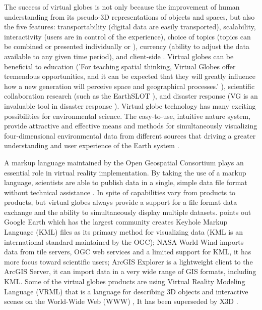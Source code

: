 The success of virtual globes \parencite{tuttle.virtual-globes.2008} is not only because the improvement of human understanding from its pseudo-3D representations of objects and spaces, but also the five features: transportability (digital data are easily transported), scalability, interactivity (users are in control of the experience), choice of topics (topics can be combined or presented individually or ), currency (ability to adjust the data available to any given time period), and client-side \parencite{tuttle.virtual-globes.2008}. Virtual globes can be beneficial to education ('For teaching spatial thinking, Virtual Globes offer tremendous opportunities, and it can be expected that they will greatly influence how a new generation will perceive space and geographical processes.' \parencite{nuernberger.vr-classroom.2006}), scientific collaboration research (such as the EarthSLOT \parencite{earthslot.2016}), and disaster response (VG is an invaluable tool in disaster response \parencite{butler.vg.2006, nourbakhsh.mapping-disaster-zones.2006}). Virtual globe technology has many exciting possibilities for environmental science. The easy-to-use, intuitive nature system, provide attractive and effective means and methods for simultaneously visualizing four-dimensional environmental data from different sources that driving a greater understanding and user experience of the Earth system \parencite{blower.sharing-visualizing.2007}. 

A markup language maintained by the Open Geospatial Consortium \parencite{ogc.2016} plays an essential role in virtual reality implementation. By taking the use of a markup language, scientists are able to publish data in a single, simple data file format without technical assistance \parencite{blower.sharing-visualizing.2007}. In spite of capabilities vary from products to products, but virtual globes always provide a support for a file format data exchange and the ability to simultaneously display multiple datasets. \parencite{blower.sharing-visualizing.2007} points out Google Earth which has the largest community creates Keyhole Markup Language (KML) \parencite{Google.kml.2016} files as its primary method for visualizing data (KML is an international standard maintained by the OGC); NASA World Wind \parencite{nasa.world-wind.2016} imports data from tile servers, OGC web services and a limited support for KML, it has more focus toward scientific users; ArcGIS Explorer \parencite{esri.arcgis-explorer.2016} is a lightweight client to the ArcGIS Server, it can import data in a very wide range of GIS formats, including KML. Some of the virtual globes products are using Virtual Reality Modeling Language (VRML) \parencite{wiki.vrml.2016} that is a language for describing 3D objects and interactive scenes on the World-Wide Web (WWW) \parencite{wiki.www.2016}, It has been superseded by X3D \parencite{wiki.x3d.2016}.

